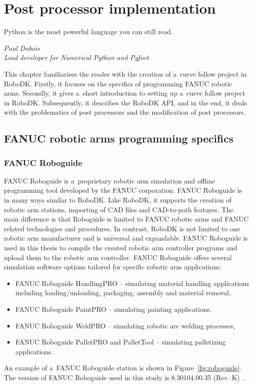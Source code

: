 \chapter{Post processor implementation \label{chap:implementation}}



\epigraph{Python is the most powerful language you can still read.}{\textit{Paul Dubois \\ Lead developer for Numerical Python and Pyfort }}

This chapter familiarises the reader with the creation of a~curve follow project in RoboDK. Firstly, it focuses on the specifics of programming FANUC robotic arms. Secondly, it gives a~short introduction to setting up a~curve follow project in RoboDK. Subsequently, it describes the RoboDK API, and in the end, it deals with the problematics of post processors and the modification of post processors.

\section{FANUC robotic arms programming specifics}

\subsection{FANUC Roboguide}

FANUC Roboguide is a~proprietary robotic arm simulation and offline programming tool developed by the FANUC corporation. FANUC Roboguide is in many ways similar to RoboDK.  Like RoboDK, it supports the creation of robotic arm stations, importing of CAD files and CAD-to-path features. The main difference is that Roboguide is limited to FANUC robotic arms and FANUC related technologies and procedures. In contrast, RoboDK is not limited to one robotic arm manufacturer and is universal and expandable. FANUC Roboguide is used in this thesis to compile the created robotic arm controller programs and upload them to the robotic arm controller. FANUC Roboguide offers several simulation software options tailored for specific robotic arm applications:

\begin{itemize}

\item FANUC Roboguide HandlingPRO -- simulating material handling applications including loading/unloading, packaging, assembly and material removal,
\item FANUC Roboguide PaintPRO -- simulating painting applications,
\item FANUC Roboguide WeldPRO -- simulating robotic arc welding processes,
\item FANUC Roboguide PalletPRO and PalletTool -- simulating palletizing applications.

\end{itemize}
An example of a~FANUC Roboguide station is shown in Figure~\ref{fig:roboguide}. The version of FANUC Roboguide used in this study is 8.30104.00.35 (Rev. K)~\cite{roboguide}. 

